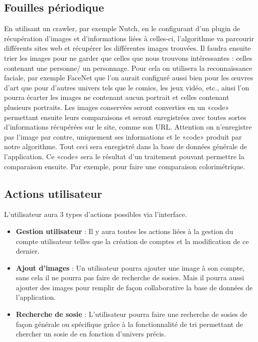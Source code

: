 \documentclass[a4paper,12pt]{article}
\begin{document}
 \subsection{Fouilles périodique} 
 En utilisant un crawler, par exemple Nutch, en le configurant d'un plugin de récupération d'images et d'informations liées à celles-ci, l'algorithme va parcourir différents sites web et récupérer les différentes images trouvées. Il faudra ensuite trier les images pour ne garder que celles que nous trouvons intéressantes : celles contenant une personne/ un personnage. Pour cela on utilisera la reconnaissance faciale, par exemple FaceNet que l'on aurait configuré aussi bien pour les œuvres d'art que pour d'autres univers tels que le comics, les jeux vidéo, etc.,  ainsi l'on pourra écarter les images ne contenant aucun portrait et celles contenant plusieurs portraits. Les images conservées seront converties en un «code» permettant ensuite leurs comparaisons et seront enregistrées avec toutes sortes d'informations récupérées sur le site, comme son URL. Attention on n'enregistre pas l'image par contre, uniquement ses informations et le «code» produit par notre algorithme. Tout ceci sera enregistré dans la base de données générale de l'application. Ce «code» sera le résultat d'un traitement pouvant permettre la comparaison ensuite. Par exemple, pour faire une comparaison colorimétrique. 
 
 \subsection{Actions utilisateur}
 L'utilisateur aura 3 types d'actions possibles via l'interface. 
 \begin{itemize}
     \item \textbf{Gestion utilisateur} : Il y aura toutes les actions liées à la gestion du compte utilisateur telles que la création de comptes et la modification de ce dernier. 
     \item \textbf{Ajout d'images} : Un utilisateur pourra ajouter une image à son compte, sans cela il ne pourra pas faire de recherche de sosies. Mais il pourra aussi ajouter des images pour remplir de façon collaborative la base de données de l'application. 
     \item \textbf{Recherche de sosie} : L'utilisateur pourra faire une recherche de sosies de façon générale ou spécifique grâce à la fonctionnalité de tri permettant de chercher un sosie de en fonction d'univers précis. 
 \end{itemize}
\end{document}
